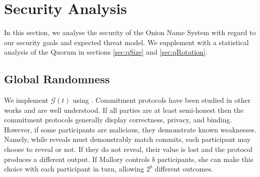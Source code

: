 \documentclass[USenglish,oneside,twocolumn]{article}
\begin{document}
%
%
%
%

\section{Security Analysis}
\label{sec:Analysis}

In this section, we analyse the security of the Onion Name System with regard to our security goals and expected threat model. We supplement with a statistical analysis of the Quorum in sections \ref{sec:qSize} and \ref{sec:qRotation}.

\subsection{Global Randomness}
\label{sec:GlobalRand}

We implement $ \mathcal{G}(t) $ using \cite{GouletCommitReveal}. Commitment protocols have been studied in other works \cite{rivest1999unconditionally, naor1990bit} and are well understood. If all parties are at least semi-honest then the commitment protocols generally display correctness, privacy, and binding. However, if some participants are malicious, they demonstrate known weaknesses. Namely, while reveals must demonstrably match commits, each participant may choose to reveal or not. If they do not reveal, their value is lost and the protocol produces a different output. If Mallory controls $ b $ participants, she can make this choice with each participant in turn, allowing $ 2^{b} $ different outcomes.
\end{document}
